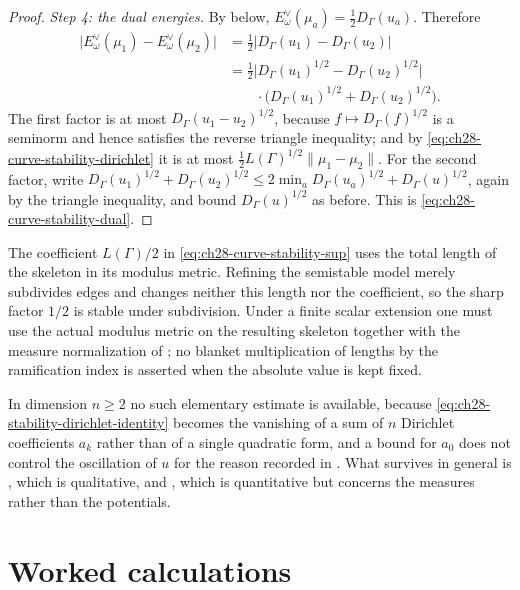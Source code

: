 \begin{proof}
\emph{Step 4: the dual energies.}  By
 below,
$E^\vee_\omega(\mu_a)=\tfrac12D_\Gamma(u_a)$.  Therefore
\[
 \begin{aligned}
 \bigl|E^\vee_\omega(\mu_1)-E^\vee_\omega(\mu_2)\bigr|
 &=\tfrac12\bigl|D_\Gamma(u_1)-D_\Gamma(u_2)\bigr|\\
 &=\tfrac12\bigl|D_\Gamma(u_1)^{1/2}-D_\Gamma(u_2)^{1/2}\bigr|\\
 &\qquad\cdot
   \bigl(D_\Gamma(u_1)^{1/2}+D_\Gamma(u_2)^{1/2}\bigr).
 \end{aligned}
\]
The first factor is at most $D_\Gamma(u_1-u_2)^{1/2}$, because
$f\mapsto D_\Gamma(f)^{1/2}$ is a seminorm and hence satisfies the reverse
triangle inequality; and by
\eqref{eq:ch28-curve-stability-dirichlet} it is at most
$\tfrac12L(\Gamma)^{1/2}\lVert\mu_1-\mu_2\rVert$.  For the second factor, write
$D_\Gamma(u_1)^{1/2}+D_\Gamma(u_2)^{1/2}
\leq 2\min_aD_\Gamma(u_a)^{1/2}+D_\Gamma(u)^{1/2}$, again by the triangle
inequality, and bound $D_\Gamma(u)^{1/2}$ as before.  This is
\eqref{eq:ch28-curve-stability-dual}.
\end{proof}

\begin{remark}
\label{rem:ch28-curve-constant}
The coefficient $L(\Gamma)/2$ in
\eqref{eq:ch28-curve-stability-sup} uses the total length of the skeleton in
its modulus metric.  Refining the semistable model merely subdivides edges
and changes neither this length nor the coefficient, so the sharp factor
$1/2$ is stable under subdivision.  Under a finite scalar extension one
must use the actual modulus metric on the resulting skeleton together with
the measure normalization of ; no blanket
multiplication of lengths by the ramification index is asserted when the
absolute value is kept fixed.

In dimension $n\geq2$ no such elementary estimate is available, because
\eqref{eq:ch28-stability-dirichlet-identity} becomes the vanishing of a sum
of $n$ Dirichlet coefficients $a_k$ rather than of a single quadratic
form, and a bound for $a_0$ does not control the oscillation of $u$ for
the reason recorded in .  What survives in
general is , which is qualitative, and
, which is quantitative but
concerns the measures rather than the potentials.
\end{remark}

\section{Worked calculations}
\label{sec:ch28-curves}

